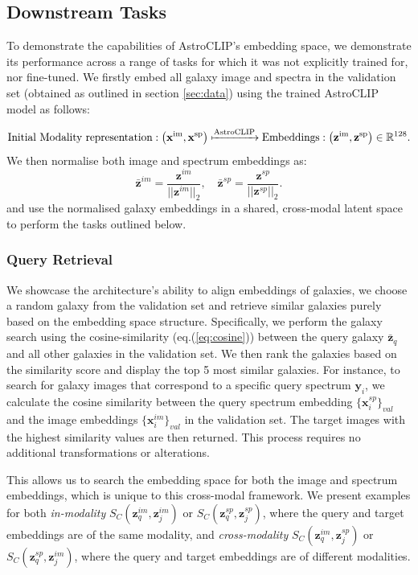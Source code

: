 \documentclass[a4paper,12pt]{article}
\begin{document}
\subsection{Downstream Tasks}
To demonstrate the capabilities of AstroCLIP's embedding space, we demonstrate its performance across a range of tasks for which it was not explicitly trained for, nor fine-tuned. We firstly embed all galaxy image and spectra in the validation set (obtained as outlined in section \ref{sec:data}) using the trained AstroCLIP model as follows:

\begin{equation}
    \text{Initial Modality representation} : \left( \mathbf{x}^{\text{im}}, \mathbf{x}^{\text{sp}} \right) \xmapsto{\text{AstroCLIP}} \text{Embeddings} : \left( \mathbf{z}^{\text{im}}, \mathbf{z}^{\text{sp}} \right) \in \mathbb{R}^{128}.
\end{equation}
We then normalise both image and spectrum embeddings as:
\begin{equation}
    \mathbf{\bar{z}}^{im} =  \frac{\mathbf{z}^{im} }{|| \mathbf{z}^{im} ||_2}, \quad \mathbf{\bar{z}}^{sp} =  \frac{\mathbf{z}^{sp} }{|| \mathbf{z}^{sp} ||_2}.
\end{equation}
and use the normalised galaxy embeddings in a shared, cross-modal latent space to perform the tasks outlined below.

\subsubsection*{Query Retrieval}
We showcase the architecture's ability to align embeddings of galaxies, we choose a random galaxy from the validation set and retrieve similar galaxies purely based on the embedding space structure. Specifically, we perform the galaxy search using the cosine-similarity (eq.(\ref{eq:cosine})) between the query galaxy $\bar{\mathbf{z}}_q$ and all other galaxies in the validation set. We then rank the galaxies based on the similarity score and display the top 5 most similar galaxies. For instance, to search for galaxy images that correspond to a specific query spectrum $\mathbf{y}_i$, we calculate the cosine similarity between the query spectrum embedding $\{\mathbf{x}^{sp}_i\}_{val}$ and the image embeddings $\{\mathbf{x}^{im}_i\}_{val}$ in the validation set. The target images with the highest similarity values are then returned. This process requires no additional transformations or alterations.

This allows us to search the embedding space for both the image and spectrum embeddings, which is unique to this cross-modal framework. We present examples for both \emph{in-modality} $S_{C}(\mathbf{z}^{im}_q, \mathbf{z}^{im}_j)$ or $S_{C}(\mathbf{z}^{sp}_q, \mathbf{z}^{sp}_j)$, where the query and target embeddings are of the same modality, and \emph{cross-modality} $S_{C}(\mathbf{z}^{im}_q, \mathbf{z}^{sp}_j)$ or $S_{C}(\mathbf{z}^{sp}_q, \mathbf{z}^{im}_j)$, where the query and target embeddings are of different modalities.
\end{document}
